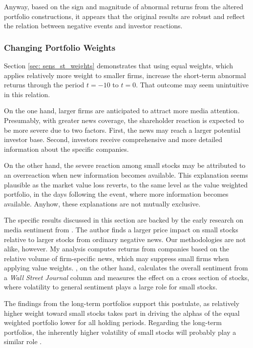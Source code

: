 Anyway, based on the sign and magnitude of abnormal returns from the altered portfolio constructions, it appears that the original results are robust and reflect the relation between negative events and investor reactions. 

\subsubsection{Changing Portfolio Weights}

Section \ref{sec: sens_st_weights} demonstrates that using equal weights, which applies relatively more weight to smaller firms, increase the short-term abnormal returns through the period $t = -10$ to $t = 0$. That outcome may seem unintuitive in this relation. 

On the one hand, larger firms are anticipated to attract more media attention. Presumably, with greater news coverage, the shareholder reaction is expected to be more severe due to two factors. First, the news may reach a larger potential investor base. Second, investors receive comprehensive and more detailed information about the specific companies. 

On the other hand, the severe reaction among small stocks may be attributed to an overreaction when new information becomes available. This explanation seems plausible as the market value loss reverts, to the same level as the value weighted portfolio, in the days following the event, where more information becomes available. Anyhow, these explanations are not mutually exclusive. 

The specific results discussed in this section are backed by the early research on media sentiment from \cite{tetlock_sentiment}. The author finds a larger price impact on small stocks relative to larger stocks from ordinary negative news. Our methodologies are not alike, however. My analysis computes returns from companies based on the relative volume of firm-specific news, which may suppress small firms when applying value weights. \citeauthor{tetlock_sentiment}, on the other hand, calculates the overall sentiment from a \textit{Wall Street Journal} column and measures the effect on a cross section of stocks, where volatility to general sentiment plays a large role for small stocks. 

The findings from the long-term portfolios support this postulate, as relatively higher weight toward small stocks takes part in driving the alphas of the equal weighted portfolio lower for all holding periods. Regarding the long-term portfolios, the inherently higher volatility of small stocks will probably play a similar role \citep{Fama_french_3fac}. 

